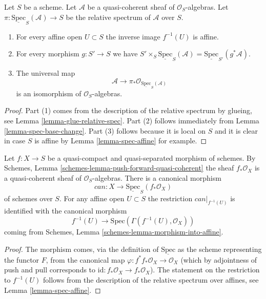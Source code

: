 \begin{lemma}
\label{lemma-spec-properties}
Let $S$ be a scheme. Let $\mathcal{A}$ be a quasi-coherent
sheaf of $\mathcal{O}_S$-algebras. Let
$\pi : \underline{\text{Spec}}_S(\mathcal{A}) \to S$
be the relative spectrum of $\mathcal{A}$ over $S$.
\begin{enumerate}
\item For every affine open $U \subset S$ the inverse image
$f^{-1}(U)$ is affine.
\item For every morphism $g : S' \to S$ we have
$S' \times_S \underline{\text{Spec}}_S(\mathcal{A}) =
\underline{\text{Spec}}_{S'}(g^*\mathcal{A})$.
\item
The universal map
$$
\mathcal{A}
\longrightarrow
\pi_*\mathcal{O}_{\underline{\text{Spec}}_S(\mathcal{A})}
$$
is an isomorphism of $\mathcal{O}_S$-algebras.
\end{enumerate}
\end{lemma}

\begin{proof}
Part (1) comes from the description of the relative spectrum
by glueing, see Lemma \ref{lemma-glue-relative-spec}.
Part (2) follows immediately from Lemma \ref{lemma-spec-base-change}.
Part (3) follows because it is local on $S$ and it is clear in case $S$
is affine by Lemma \ref{lemma-spec-affine} for example.
\end{proof}

\begin{lemma}
\label{lemma-canonical-morphism}
Let $f : X \to S$ be a quasi-compact and quasi-separated morphism
of schemes. By Schemes, Lemma \ref{schemes-lemma-push-forward-quasi-coherent}
the sheaf $f_*\mathcal{O}_X$ is a quasi-coherent sheaf of
$\mathcal{O}_S$-algebras. There is a canonical morphism
$$
can : X \longrightarrow \underline{\text{Spec}}_S(f_*\mathcal{O}_X)
$$
of schemes over $S$.
For any affine open $U \subset S$ the restriction $can|_{f^{-1}(U)}$
is identified with the canonical morphism
$$
f^{-1}(U) \longrightarrow \text{Spec}(\Gamma(f^{-1}(U), \mathcal{O}_X))
$$
coming from Schemes, Lemma \ref{schemes-lemma-morphism-into-affine}.
\end{lemma}

\begin{proof}
The morphism comes, via the definition of $\underline{\text{Spec}}$
as the scheme representing the functor $F$, from the canonical map
$\varphi : f^*f_*\mathcal{O}_X \to \mathcal{O}_X$ (which by adjointness of
push and pull corresponds to
$\text{id} : f_*\mathcal{O}_X \to f_*\mathcal{O}_X$).
The statement on the restriction to $f^{-1}(U)$
follows from the description of the relative spectrum over
affines, see Lemma \ref{lemma-spec-affine}.
\end{proof}











